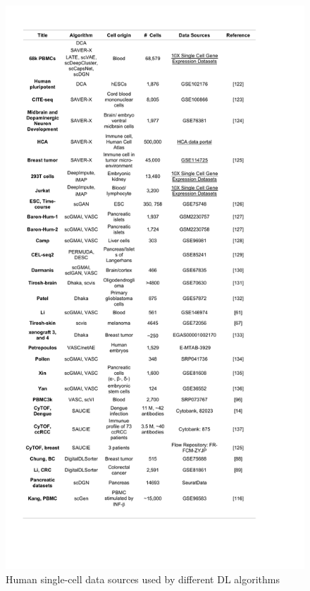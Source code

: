 \documentclass[
]{book}
\begin{document}
\begin{figure}

{\centering \includegraphics[width=19.78in]{Table/Table2b} 

}

\caption{Human single-cell data sources used by different DL algorithms}\label{fig:Table2b}
\end{figure}
\end{document}
